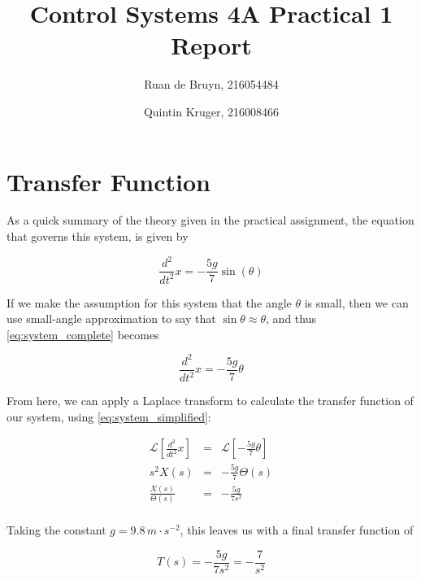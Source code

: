 \documentclass[a4paper, 12pt]{article}
\title{Control Systems 4A Practical 1 Report}
\author{Ruan de Bruyn, 216054484 \and Quintin Kruger, 216008466}
\begin{document}
\begin{titlepage}
  \maketitle
\end{titlepage}

\tableofcontents
\newpage
{}

\section{Transfer Function}
	As a quick summary of the theory given in the practical assignment, the
	equation that governs this system, is given by

	\begin{equation}
	  \frac{d^2}{dt^2} x = -\frac{5g}{7} \sin(\theta)
	  \label{eq:system_complete}
	\end{equation}

	If we make the assumption for this system that the angle $\theta$ is small,
	then we can use small-angle approximation to say that $\sin \theta \approx
	\theta$, and thus \eqref{eq:system_complete} becomes

	\begin{equation}
	  \frac{d^2}{dt^2} x = -\frac{5g}{7} \theta
	  \label{eq:system_simplified}
	\end{equation}

	From here, we can apply a Laplace transform to calculate the transfer function of
	our system, using \eqref{eq:system_simplified}:

	\begin{equation*}
	  \begin{array}{rcl}
		\mathcal{L}\left[ \frac{d^2}{dt^2}x \right] & = & \mathcal{L}\left[ -\frac{5g}{7}\theta \right] \\
		s^2 X(s) & = & -\frac{5g}{7}\Theta(s) \\
		\frac{X(s)}{\Theta(s)}  & = & -\frac{5g}{7s^2} \\
	  \end{array}
	  \label{eq:transfer_function}
	\end{equation*}
	
	Taking the constant $g = 9.8 \, m \cdot s^{-2}$, this leaves us with a final transfer function of

	\begin{equation}
	  T(s) = -\frac{5g}{7s^2} = -\frac{7}{s^2}
	  \label{eq:tf_final}
	\end{equation}
\end{document}
